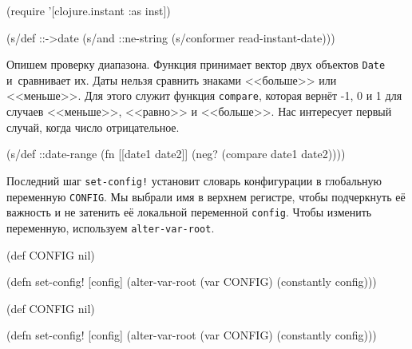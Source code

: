 \else

\begin{english}
  \begin{clojure}
(require '[clojure.instant :as inst])

(s/def ::->date
  (s/and ::ne-string (s/conformer read-instant-date)))
  \end{clojure}
\end{english}

\fi


Опишем проверку диапазона. Функция принимает вектор двух объектов \verb|Date|
и~сравнивает их. Даты нельзя сравнить знаками <<больше>> или <<меньше>>. Для
этого служит функция \verb|compare|, которая вернёт -1, 0 и 1 для случаев
<<меньше>>, <<равно>> и <<больше>>. Нас интересует первый случай, когда число
отрицательное.

\begin{english}
  \begin{clojure}
(s/def ::date-range
  (fn [[date1 date2]]
    (neg? (compare date1 date2))))
  \end{clojure}
\end{english}

Последний шаг \verb|set-config!| установит словарь конфигурации в глобальную
переменную \verb|CONFIG|. Мы выбрали имя в верхнем регистре, чтобы подчеркнуть
её важность и не затенить её локальной переменной \verb|config|. Чтобы изменить
переменную, используем \verb|alter-var-root|.


\ifnarrow

\begin{english}
  \begin{clojure}
(def CONFIG nil)

(defn set-config!
  [config]
  (alter-var-root (var CONFIG)
    (constantly config)))
  \end{clojure}
\end{english}

\else

\begin{english}
  \begin{clojure}
(def CONFIG nil)

(defn set-config!
  [config]
  (alter-var-root (var CONFIG) (constantly config)))
  \end{clojure}
\end{english}

